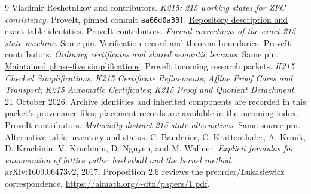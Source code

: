 \documentclass[11pt,letterpaper]{article}
\newcommand{\code}[1]{\texttt{#1}}
\begin{document}
\begin{thebibliography}{9}
 Vladimir Reshetnikov and contributors. \emph{K215: 215 working states for ZFC consistency}. ProveIt, pinned commit \code{aa66d0a33f}. \href{https://github.com/VladimirReshetnikov/ProveIt/blob/aa66d0a33f1f8237a348899eb8095b045a502832/Computability/BusyBeaver/Research/ZFC/candidate-k215/README.md}{Repository description and exact-table identities}.
 ProveIt contributors. \emph{Formal correctness of the exact 215-state machine}. Same pin. \href{https://github.com/VladimirReshetnikov/ProveIt/blob/aa66d0a33f1f8237a348899eb8095b045a502832/Computability/BusyBeaver/Research/ZFC/k225-formal/verification/k215/README.md}{Verification record and theorem boundaries}.
 ProveIt contributors. \emph{Ordinary certificates and shared semantic lemmas}. Same pin. \href{https://github.com/VladimirReshetnikov/ProveIt/blob/aa66d0a33f1f8237a348899eb8095b045a502832/Computability/BusyBeaver/Research/ZFC/k225-formal/verification/k215/simplification/phase5/README.md}{Maintained phase-five simplifications}.
 ProveIt incoming research packets. \emph{K215 Checked Simplifications}; \emph{K215 Certificate Refinements}; \emph{Affine Proof Cores and Transport}; \emph{K215 Automatic Certificates}; \emph{K215 Proof and Quotient Detachment}. 21 October 2026. Archive identities and inherited components are recorded in this packet's provenance files; placement records are available in \href{https://github.com/VladimirReshetnikov/ProveIt/blob/56e487ce8fa4cf63ad169ffe0cd2944e9fc62dd3/docs/incoming/README.md}{the incoming index}.
 ProveIt contributors. \emph{Materially distinct 215-state alternatives}. Same source pin. \href{https://github.com/VladimirReshetnikov/ProveIt/blob/aa66d0a33f1f8237a348899eb8095b045a502832/Computability/BusyBeaver/Research/ZFC/candidate-k215/alternatives/README.md}{Alternative table inventory and status}.
 C. Banderier, C. Krattenthaler, A. Krinik, D. Kruchinin, V. Kruchinin, D. Nguyen, and M. Wallner. \emph{Explicit formulas for enumeration of lattice paths: basketball and the kernel method}. arXiv:1609.06473v2, 2017. Proposition 2.6 reviews the preorder/\L ukasiewicz correspondence. \url{https://aimath.org/~dtn/papers/1.pdf}.
\end{thebibliography}
\end{document}
